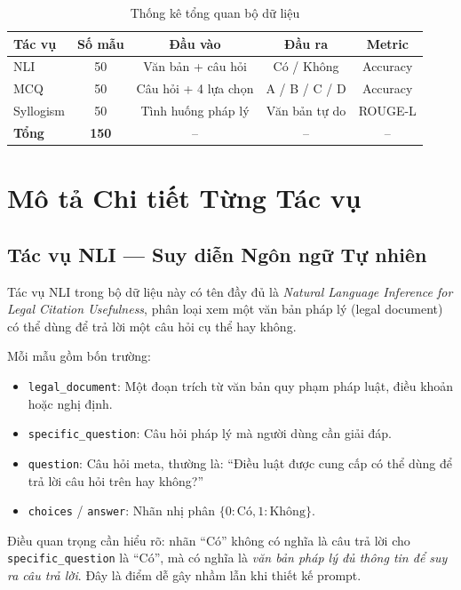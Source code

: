 \documentclass[fontsize=13pt,a4paper,oneside,DIV=calc,chapterprefix=true]{scrbook}
\begin{document}
\begin{table}[H]
\centering
\caption{Thống kê tổng quan bộ dữ liệu}
\label{tab:dataset_overview}
\begin{tabular}{lcccc}
\toprule
\textbf{Tác vụ} & \textbf{Số mẫu} & \textbf{Đầu vào} & \textbf{Đầu ra} & \textbf{Metric} \\
\midrule
NLI & 50 & Văn bản + câu hỏi & Có / Không & Accuracy \\
MCQ & 50 & Câu hỏi + 4 lựa chọn & A / B / C / D & Accuracy \\
Syllogism & 50 & Tình huống pháp lý & Văn bản tự do & ROUGE-L \\
\midrule
\textbf{Tổng} & \textbf{150} & -- & -- & -- \\
\bottomrule
\end{tabular}
\end{table}

\section{Mô tả Chi tiết Từng Tác vụ}

\subsection{Tác vụ NLI --- Suy diễn Ngôn ngữ Tự nhiên}

Tác vụ NLI trong bộ dữ liệu này có tên đầy đủ là \textit{Natural Language Inference for Legal
Citation Usefulness}, phân loại xem một văn bản pháp lý (legal document) có thể dùng để trả
lời một câu hỏi cụ thể hay không.

Mỗi mẫu gồm bốn trường:
\begin{itemize}
  \item \texttt{legal\_document}: Một đoạn trích từ văn bản quy phạm pháp luật, điều khoản
    hoặc nghị định.
  \item \texttt{specific\_question}: Câu hỏi pháp lý mà người dùng cần giải đáp.
  \item \texttt{question}: Câu hỏi meta, thường là: ``Điều luật được cung cấp có thể dùng để
    trả lời câu hỏi trên hay không?''
  \item \texttt{choices} / \texttt{answer}: Nhãn nhị phân $\{0: \text{Có}, 1: \text{Không}\}$.
\end{itemize}

Điều quan trọng cần hiểu rõ: nhãn ``Có'' không có nghĩa là câu trả lời cho
\texttt{specific\_question} là ``Có'', mà có nghĩa là \textit{văn bản pháp lý đủ thông tin
để suy ra câu trả lời}. Đây là điểm dễ gây nhầm lẫn khi thiết kế prompt.
\end{document}
